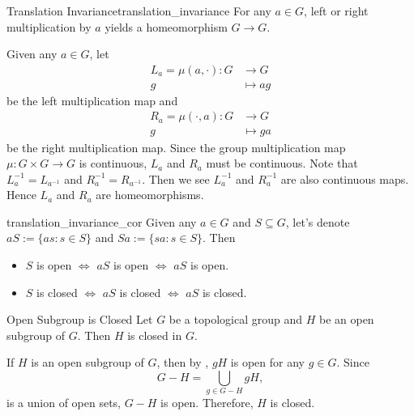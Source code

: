 \documentclass{report}
\begin{document}
\begin{proposition}{Translation Invariance}{translation_invariance}
	For any $a \in G$, left or right multiplication by $a$ yields a homeomorphism $G \rightarrow G$.
\end{proposition}

\begin{prf}
	Given any $a\in G$, let
	\begin{align*}
		L_a=\mu(a,\cdot):G & \longrightarrow G \\
		g                  & \longmapsto ag
	\end{align*}
	be the left multiplication map and
	\begin{align*}
		R_a=\mu(\cdot,a):G & \longrightarrow G \\
		g                  & \longmapsto ga
	\end{align*}
	be the right multiplication map. Since the group multiplication map $\mu:G\times G\to G$ is continuous, $L_a$ and $R_a$ must be continuous. Note that $L_a^{-1}=L_{a^{-1}}$ and $R_a^{-1}=R_{a^{-1}}$. Then we see $L_a^{-1}$ and $R_a^{-1}$ are also continuous maps. Hence $L_a$ and $R_a$ are homeomorphisms.
\end{prf}


\begin{corollary}{}{translation_invariance_cor}
	Given any $a \in G$ and $S \subseteq G$, let's denote $a S:=\{a s: s \in S\}$ and $S a:=\{s a: s \in S\}$. Then
	\begin{itemize}
		\item $S$ is open $\iff$ $a S$ is open $\iff$ $a S$ is open.
		\item $S$ is closed $\iff$ $a S$ is closed $\iff$ $a S$ is closed.
	\end{itemize}
\end{corollary}

\begin{proposition}{Open Subgroup is Closed}{}
	Let $G$ be a topological group and $H$ be an open subgroup of $G$. Then $H$ is closed in $G$.
\end{proposition}
\begin{prf}
	If $H$ is an open subgroup of $G$, then	by , $gH$ is open for any $g\in G$. 
	Since
	\[
	G-H=\bigcup_{g\in G-H} gH,
	\]
	is a union of open sets, $G-H$ is open. Therefore, $H$ is closed.
\end{prf}
\end{document}
